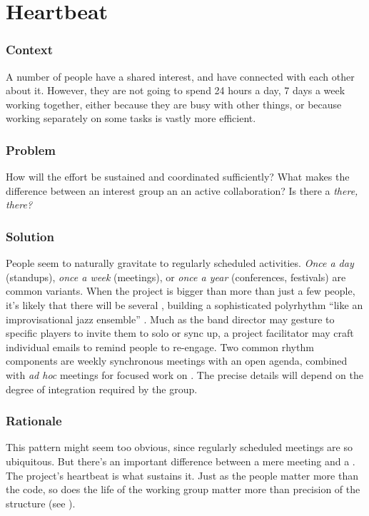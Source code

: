 \section{Heartbeat}\label{sec:Heartbeat}

\subsubsection*{Context}
A number of people have a shared interest, and have connected with each other about it.  However, they are not going to spend 24 hours a day, 7 days a week working together, either because they are busy with other things, or because working separately on some tasks is vastly more efficient.

\subsubsection*{Problem} How will the effort be sustained and coordinated sufficiently?  What makes the difference between an interest group an an active collaboration?  Is there a \emph{there, there?}

\subsubsection*{Solution} People seem to naturally gravitate to regularly scheduled activities.  \emph{Once a day} (standups), \emph{once a week} (meetings), or \emph{once a year} (conferences, festivals) are common variants.  When the project is bigger than more than just a few people, it's likely that there will be several , building a sophisticated polyrhythm ``like an improvisational jazz ensemble'' \cite{david2001software}.  Much as the band director may gesture to specific players to invite them to solo or sync up, a project facilitator may craft individual emails to remind people to re-engage.  Two common rhythm components are weekly synchronous meetings with an open agenda, combined with \emph{ad hoc} meetings for focused work on .  The precise details will depend on the degree of integration required by the group.

\subsubsection*{Rationale}  This pattern might seem too obvious, since regularly scheduled meetings are so ubiquitous.  
But there's an important difference between a mere meeting and a .  The project's heartbeat is what sustains it. Just as the people matter more than the code, so does the life of the working group matter more than precision of the structure (see ).

